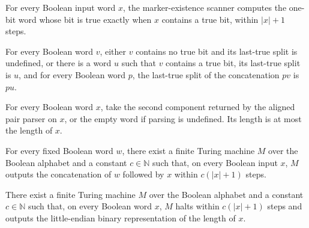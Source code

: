 \begin{lemma}
\label{Turing.FinTM.anyTrue_computes}
\leanok
{}
For every Boolean input word $x$, the marker-existence scanner computes the one-bit word
whose bit is true exactly when $x$ contains a true bit, within $|x|+1$ steps.
\end{lemma}

\begin{lemma}
\label{Turing.FinTM.catalogMarker_cases}
\leanok
{}
For every Boolean word $v$, either $v$ contains no true bit and its last-true split is
undefined, or there is a word $u$ such that $v$ contains a true bit, its last-true split
is $u$, and for every Boolean word $p$, the last-true split of the concatenation $pv$ is
$pu$.
\end{lemma}

\begin{lemma}
\label{Turing.FinTM.catalogPayload_length}
\leanok
{}
For every Boolean word $x$, take the second component returned by the aligned pair
parser on $x$, or the empty word if parsing is undefined. Its length is at most the
length of $x$.
\end{lemma}

\begin{theorem}
\label{Turing.FinTM.computesFunInTime_prepend}
\leanok
{}
For every fixed Boolean word $w$, there exist a finite Turing machine $M$ over the
Boolean alphabet and a constant $c\in\mathbb{N}$ such that, on every Boolean input $x$,
$M$ outputs the concatenation of $w$ followed by $x$ within $c(|x|+1)$ steps.
\end{theorem}

\begin{theorem}
\label{Turing.FinTM.computesFunInTime_lengthBits}
\leanok
{}
There exist a finite Turing machine $M$ over the Boolean alphabet and a constant
$c\in\mathbb{N}$ such that, on every Boolean word $x$, $M$ halts within $c(|x|+1)$ steps
and outputs the little-endian binary representation of the length of $x$.
\end{theorem}

